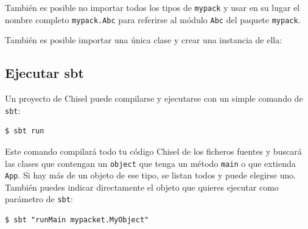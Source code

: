 \documentclass[%
    10pt,
    headinclude, footinclude=false,
    openright, %
    notitlepage,
    cleardoublepage=empty,
    headsepline,
    numbers=noenddot,
    bibliography=totoc, index=totoc,
    ]{scrbook}
\newcommand{\code}[1]{{\lstinline[basicstyle=\small\ttfamily]{#1}}}
\newcommand{\codefoot}[1]{{\lstinline[basicstyle=\footnotesize\ttfamily]{#1}}}
\begin{document}

\noindent También es posible no importar todos los tipos de \code{mypack} y
usar en su lugar el nombre completo \code{mypack.Abc} para referirse al módulo
\code{Abc} del paquete \code{mypack}.



\noindent También es posible importar una única clase y crear una instancia de ella:



\subsection{Ejecutar sbt}


Un proyecto de Chisel puede compilarse y ejecutarse con un simple comando de \code{sbt}:

\begin{verbatim}
$ sbt run
\end{verbatim}


Este comando compilará todo tu código Chisel de los ficheros fuentes y buscará
las clases que contengan un \code{object} que tenga un método \code{main} o que
extienda \code{App}. Si hay más de un objeto de ese tipo, se listan todos y
puede elegirse uno.
También puedes indicar directamente el objeto que quieres ejecutar como parámetro de \code{sbt}:

\begin{verbatim}
$ sbt "runMain mypacket.MyObject"
\end{verbatim}

\end{document}
